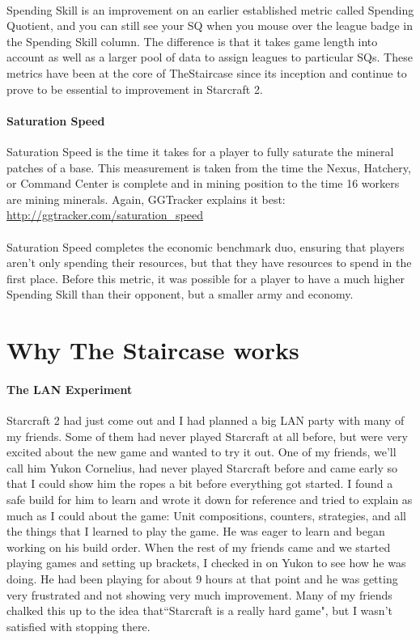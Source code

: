\documentclass{article}
\begin{document}
\paragraph{}
Spending Skill is an improvement on an earlier established metric called
Spending Quotient, and you can still see your SQ when you mouse over the league
badge in the Spending Skill column. The difference is that it takes game length
into account as well as a larger pool of data to assign leagues to particular
SQs. These metrics have been at the core of TheStaircase since its inception and
continue to prove to be essential to improvement in Starcraft 2.

\paragraph{Saturation Speed}
Saturation Speed is the time it takes for a player to fully saturate the mineral
patches of a base. This measurement is taken from the time the Nexus, Hatchery,
or Command Center is complete and in mining position to the time 16 workers are
mining minerals. Again, GGTracker explains it best:
\url{http://ggtracker.com/saturation_speed}

\paragraph{}
Saturation Speed completes the economic benchmark duo, ensuring that players
aren’t only spending their resources, but that they have resources to spend in
the first place. Before this metric, it was possible for a player to have a much
higher Spending Skill than their opponent, but a smaller army and economy.


\section{Why The Staircase works}
\paragraph{The LAN Experiment}
Starcraft 2 had just come out and I had planned a big LAN party with many of my
friends. Some of them had never played Starcraft at all before, but were very
excited about the new game and wanted to try it out. One of my friends, we’ll
call him Yukon Cornelius, had never played Starcraft before and came early so
that I could show him the ropes a bit before everything got started. I found a
safe build for him to learn and wrote it down for reference and tried to explain
as much as I could about the game: Unit compositions, counters, strategies, and
all the things that I learned to play the game. He was eager to learn and began
working on his build order. When the rest of my friends came and we started
playing games and setting up brackets, I checked in on Yukon to see how he was
doing. He had been playing for about 9 hours at that point and he was getting
very frustrated and not showing very much improvement. Many of my friends
chalked this up to the idea that``Starcraft is a really hard game", but I wasn’t
satisfied with stopping there. 
\end{document}
